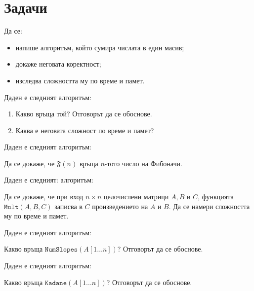 \section{Задачи}

\begin{problem}
Да се:
\begin{itemize}
    \item напише алгоритъм, който сумира числата в един масив;
    \item докаже неговата коректност;
    \item изследва сложността му по време и памет.
\end{itemize}
\end{problem}

\begin{problem}
Даден е следният алгоритъм:


\begin{enumerate}
    \item Какво връща той? Отговорът да се обоснове.
    \item Каква е неговата сложност по време и памет?
\end{enumerate}
\end{problem}

\begin{problem}
Даден е следният алгоритъм:


Да се докаже, че $\mathfrak{F}(n)$ връща $n$-тото число на Фибоначи.
\end{problem}

\begin{problem}
Даден е следният: алгоритъм:


Да се докаже, че при вход $n \times n$ целочислени матрици $A, B$ и $C$, функцията $\mathtt{Mult}(A, B, C)$ записва в $C$ произведението на $A$ и $B$.
Да се намери сложността му по време и памет.
\end{problem}

\begin{problem}
Даден е следният алгоритъм:


Какво връща $\mathtt{NumSlopes}(A[1 \dots n])$?
Отговорът да се обоснове.
\end{problem}

\begin{problem}
Даден е следният алгоритъм:


Какво връща $\mathtt{Kadane}(A[1 \dots n])$?
Отговорът да се обоснове.
\end{problem}

